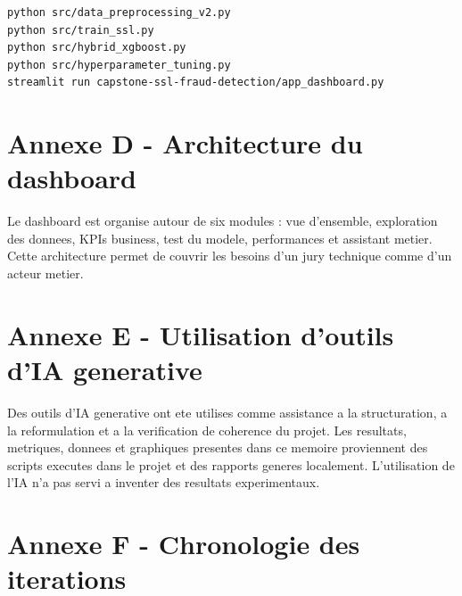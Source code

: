 ﻿\documentclass[12pt,a4paper,oneside]{report}
\begin{document}
\begin{verbatim}
python src/data_preprocessing_v2.py
python src/train_ssl.py
python src/hybrid_xgboost.py
python src/hyperparameter_tuning.py
streamlit run capstone-ssl-fraud-detection/app_dashboard.py
\end{verbatim}

\chapter{Annexe D - Architecture du dashboard}

Le dashboard est organise autour de six modules : vue d'ensemble, exploration des donnees, KPIs business, test du modele, performances et assistant metier. Cette architecture permet de couvrir les besoins d'un jury technique comme d'un acteur metier.

\chapter{Annexe E - Utilisation d'outils d'IA generative}

Des outils d'IA generative ont ete utilises comme assistance a la structuration, a la reformulation et a la verification de coherence du projet. Les resultats, metriques, donnees et graphiques presentes dans ce memoire proviennent des scripts executes dans le projet et des rapports generes localement. L'utilisation de l'IA n'a pas servi a inventer des resultats experimentaux.

\chapter{Annexe F - Chronologie des iterations}
\end{document}
